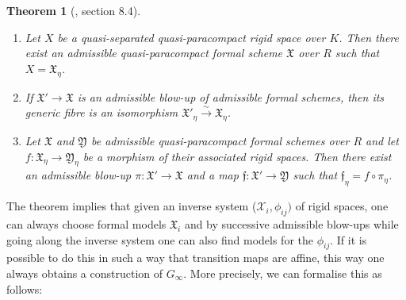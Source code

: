 \documentclass[11pt,oneside]{amsart}
\newtheorem{theorem}{Theorem}[section]
\theoremstyle{definition}
\theoremstyle{remark}
\begin{document}
	\begin{theorem}[\cite{Bosch lectures}, section 8.4]\label{Raynaud theory main theorem}
		\leavevmode
		\begin{enumerate}
			
			\item Let $X$ be a quasi-separated quasi-paracompact rigid space over $K$. Then there exist an admissible quasi-paracompact formal scheme $\mathfrak X$ over $R$ such that $X=\mathfrak X_\eta$.
			\item If $\mathfrak X'\rightarrow \mathfrak X$ is an admissible blow-up of admissible formal schemes, then its generic fibre is an isomorphism $\mathfrak X'_\eta \xrightarrow{\sim} \mathfrak X_\eta$.
			\item Let $\mathfrak X$ and $\mathfrak Y$ be admissible quasi-paracompact formal schemes over $R$ and let $f:\mathfrak X_\eta \rightarrow \mathfrak Y_\eta$ be a morphism of their associated rigid spaces. Then there exist an admissible blow-up $\pi:\mathfrak X'\rightarrow \mathfrak X$ and a map $\mathfrak f:\mathfrak X'\rightarrow \mathfrak Y$ such that $\mathfrak f_\eta = f\circ \pi_\eta$.
			\begin{center}
				
			\end{center}
		\end{enumerate}
	\end{theorem}
	
	The theorem implies that given an inverse system ($\mathcal X_i,\phi_{ij})$ of rigid spaces, one can always choose formal models $\mathfrak X_i$ and by successive admissible blow-ups while going along the inverse system one can also find models for the $\phi_{ij}$. If it is possible to do this in such a way that transition maps are affine, this way one always obtains a construction of $G_\infty$. More precisely, we can formalise this as follows:
	
\end{document}
